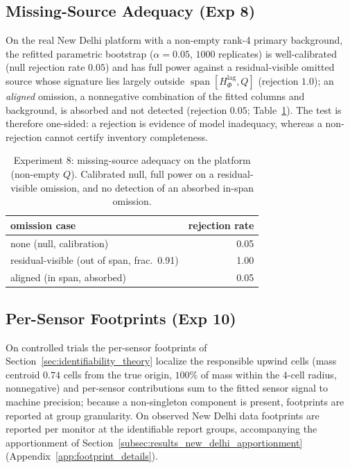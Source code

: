\subsection{Missing-Source Adequacy (Exp 8)}
\label{subsec:results_missing_source}
On the real New Delhi platform with a non-empty rank-4 primary background, the
refitted parametric bootstrap ($\alpha=0.05$, $1000$ replicates) is well-calibrated
(null rejection rate $0.05$) and has full power against a residual-visible omitted
source whose signature lies largely outside
$\operatorname{span}[H_\Phi^{\mathrm{lag}},Q]$ (rejection $1.0$); an \emph{aligned}
omission, a nonnegative combination of the fitted columns and background, is absorbed
and not detected (rejection $0.05$; Table~\ref{tab:results_missing}). The test is
therefore one-sided: a rejection is evidence of model inadequacy, whereas a
non-rejection cannot certify inventory completeness.
\begin{table}[t]
\centering
\footnotesize
\caption{Experiment 8: missing-source adequacy on the platform (non-empty $Q$).
Calibrated null, full power on a residual-visible omission, and no detection of an
absorbed in-span omission.}
\label{tab:results_missing}
\begin{tabular}{lr}
\toprule
omission case & rejection rate \\
\midrule
none (null, calibration) & 0.05 \\
residual-visible (out of span, frac.\ 0.91) & 1.00 \\
aligned (in span, absorbed) & 0.05 \\
\bottomrule
\end{tabular}
\end{table}

\subsection{Per-Sensor Footprints (Exp 10)}
\label{subsec:results_footprints}
On controlled trials the per-sensor footprints of
Section~\ref{sec:identifiability_theory} localize the responsible upwind cells (mass
centroid $0.74$ cells from the true origin, $100\%$ of mass within the $4$-cell
radius, nonnegative) and per-sensor contributions sum to the fitted sensor signal to
machine precision; because a non-singleton component is present, footprints are
reported at group granularity. On observed New Delhi data footprints are reported per
monitor at the identifiable report groups, accompanying the apportionment of
Section~\ref{subsec:results_new_delhi_apportionment}
(Appendix~\ref{app:footprint_details}).

